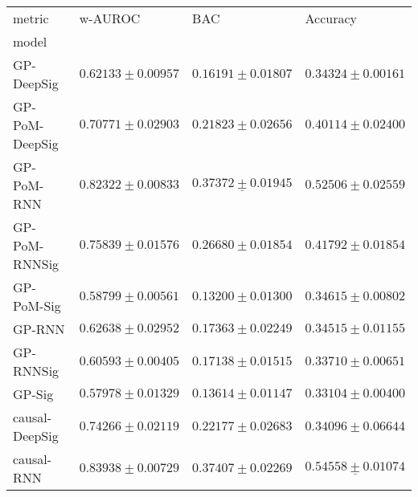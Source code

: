\begin{tabular}{llll}
\toprule
metric &                                           w-AUROC &                                               BAC &                                          Accuracy \\
model          &                                                   &                                                   &                                                   \\
\midrule
GP-DeepSig     &                           $ 0.62133 \pm 0.00957 $ &                           $ 0.16191 \pm 0.01807 $ &                           $ 0.34324 \pm 0.00161 $ \\
GP-PoM-DeepSig &                           $ 0.70771 \pm 0.02903 $ &                           $ 0.21823 \pm 0.02656 $ &                           $ 0.40114 \pm 0.02400 $ \\
GP-PoM-RNN     &                           $ 0.82322 \pm 0.00833 $ &            $  \underline{ 0.37372 \pm 0.01945 } $ &                           $ 0.52506 \pm 0.02559 $ \\
GP-PoM-RNNSig  &                           $ 0.75839 \pm 0.01576 $ &                           $ 0.26680 \pm 0.01854 $ &                           $ 0.41792 \pm 0.01854 $ \\
GP-PoM-Sig     &                           $ 0.58799 \pm 0.00561 $ &                           $ 0.13200 \pm 0.01300 $ &                           $ 0.34615 \pm 0.00802 $ \\
GP-RNN         &                           $ 0.62638 \pm 0.02952 $ &                           $ 0.17363 \pm 0.02249 $ &                           $ 0.34515 \pm 0.01155 $ \\
GP-RNNSig      &                           $ 0.60593 \pm 0.00405 $ &                           $ 0.17138 \pm 0.01515 $ &                           $ 0.33710 \pm 0.00651 $ \\
GP-Sig         &                           $ 0.57978 \pm 0.01329 $ &                           $ 0.13614 \pm 0.01147 $ &                           $ 0.33104 \pm 0.00400 $ \\
causal-DeepSig &                           $ 0.74266 \pm 0.02119 $ &                           $ 0.22177 \pm 0.02683 $ &                           $ 0.34096 \pm 0.06644 $ \\
causal-RNN     &               $  \mathbf{ 0.83938 \pm 0.00729 } $ &               $  \mathbf{ 0.37407 \pm 0.02269 } $ &  $  \mathbf{ \underline{ 0.54558 \pm 0.01074 }} $ \\

\end{tabular}
